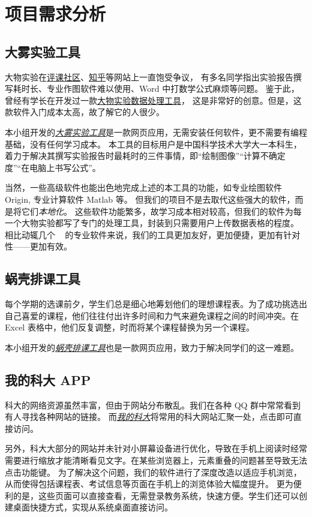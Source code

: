 \section{项目需求分析}

\subsection{大雾实验工具}

大物实验在\href{https://icourse.club/course/12716/}{评课社区}、\href{https://www.zhihu.com/question/35867101}{知乎}等网站上一直饱受争议，
有多名同学指出实验报告撰写耗时长、专业作图软件难以使用、Word 中打数学公式麻烦等问题。
鉴于此，曾经有学长在开发过一款\href{https://github.com/regymm/PhysicsExp}{大物实验数据处理工具}，
这是非常好的创意。但是，这款软件入门成本太高，故了解它的人很少。

本小组开发的\href{https://dawu.feixu.site/}{\emph{大雾实验工具}}是一款网页应用，无需安装任何软件，更不需要有编程基础，没有任何学习成本。
本工具的目标用户是中国科学技术大学大一本科生，着力于解决其撰写实验报告时最耗时的三件事情，即“绘制图像”“计算不确定度”“在电脑上书写公式”。

当然，一些高级软件也能出色地完成上述的本工具的功能，如专业绘图软件 Origin, 专业计算软件 Matlab 等。
但我们的项目不是去取代这些强大的软件，而是将它们\emph{本地化}。
这些软件功能繁多，故学习成本相对较高，但我们的软件为每一个大物实验都写了专门的处理工具，封装到只需要用户上传数据表格的程度。
相比动辄几个 \unit{\giga\byte} 的专业软件来说，我们的工具更加友好，更加便捷，更加有针对性——更加有效。

\subsection{蜗壳排课工具}

每个学期的选课前夕，学生们总是细心地筹划他们的理想课程表。为了成功挑选出自己喜爱的课程，他们往往付出许多时间和力气来避免课程之间的时间冲突。在 Excel 表格中，他们反复调整，时而将某个课程替换为另一个课程。

本小组开发的\href{https://paike.feixu.site/}{\emph{蜗壳排课工具}}也是一款网页应用，致力于解决同学们的这一难题。

\subsection{我的科大 APP}

科大的网络资源虽然丰富，但由于网站分布散乱。我们在各种 QQ 群中常常看到有人寻找各种网站的链接。
而\href{https://myustc.feixu.site/}{\emph{我的科大}}将常用的科大网站汇聚一处，点击即可直接访问。

另外，科大大部分的网站并未针对小屏幕设备进行优化，导致在手机上阅读时经常需要进行缩放才能清晰看见文字。在某些浏览器上，元素重叠的问题甚至导致无法点击功能键。
为了解决这个问题，我们的软件进行了深度改造以适应手机浏览，从而使得包括课程表、考试信息等页面在手机上的浏览体验大幅度提升。
更为便利的是，这些页面可以直接查看，无需登录教务系统，快速方便。学生们还可以创建桌面快捷方式，实现从系统桌面直接访问。